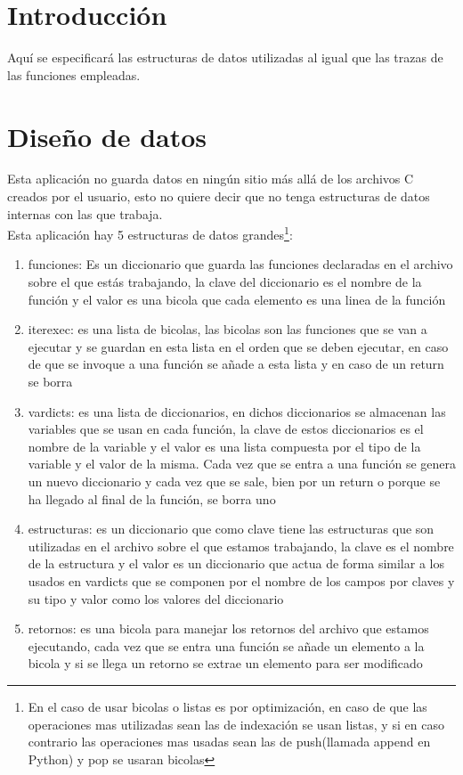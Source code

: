 
\section{Introducción}

Aquí se especificará las estructuras de datos utilizadas al igual que las trazas de las funciones empleadas.

\section{Diseño de datos}

Esta aplicación no guarda datos en ningún sitio más allá de los archivos C creados por el usuario,
esto no quiere decir que no tenga estructuras de datos internas con las que trabaja.\\
Esta aplicación hay 5 estructuras de datos grandes\footnote{En el caso de usar bicolas o listas es por optimización, en caso de que las operaciones mas utilizadas sean las de indexación se usan listas, y si en caso contrario las operaciones mas usadas sean las de push(llamada append en Python) y pop se usaran bicolas}: \begin{enumerate}
\item funciones: Es un diccionario que guarda las funciones declaradas en el archivo sobre el que estás trabajando, la clave del diccionario es el nombre de la función y el valor es una bicola que cada elemento es una linea de la función
\item iterexec: es una lista de bicolas, las bicolas son las funciones que se van a ejecutar y se guardan en esta lista en el orden que se deben ejecutar, en caso de que se invoque a una función se añade a esta lista y en caso de un return se borra
\item vardicts: es una lista de diccionarios, en dichos diccionarios se almacenan las variables que se usan en cada función, la clave de estos diccionarios es el nombre de la variable y el valor es una lista compuesta por el tipo de la variable y el valor de la misma. Cada vez que se entra a una función se genera un nuevo diccionario y cada vez que se sale, bien por un return o porque se ha llegado al final de la función, se borra uno
\item estructuras: es un diccionario que como clave tiene las estructuras que son utilizadas en el archivo sobre el que estamos trabajando, la clave es el nombre de la estructura y el valor es un diccionario que actua de forma similar a los usados en vardicts que se componen por el nombre de los campos por claves y su tipo y valor como los valores del diccionario
\item retornos: es una bicola para manejar los retornos del archivo que estamos ejecutando, cada vez que se entra una función se añade un elemento a la bicola y si se llega un retorno se extrae un elemento para ser modificado
\end{enumerate}

